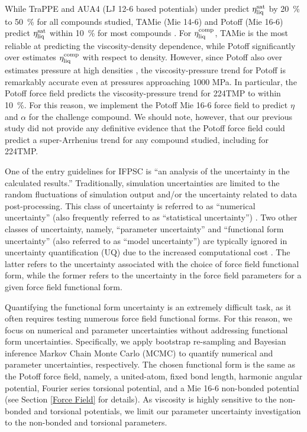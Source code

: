 \documentclass[preprint,review,12pt]{elsarticle}
\begin{document}
	While TraPPE and AUA4 (LJ 12-6 based potentials) under predict $\eta_{\rm liq}^{\rm sat}$ by 20~\% to 50~\% for all compounds studied, TAMie (Mie 14-6) and Potoff (Mie 16-6) predict $\eta_{\rm liq}^{\rm sat}$ within 10~\% for most compounds \cite{Postdoc_3}. For $\eta_{\rm liq}^{\rm comp}$, TAMie is the most reliable at predicting the viscosity-density dependence, while Potoff significantly over estimates $\eta_{\rm liq}^{\rm comp}$ with respect to density. However, since Potoff also over estimates pressure at high densities \cite{Postdoc_2}, the viscosity-pressure trend for Potoff is remarkably accurate even at pressures approaching 1000 MPa. In particular, the Potoff force field predicts the viscosity-pressure trend for 224TMP to within 10~\%. For this reason, we implement the Potoff Mie 16-6 force field to predict $\eta$ and $\alpha$ for the challenge compound. We should note, however, that our previous study did not provide any definitive evidence that the Potoff force field could predict a super-Arrhenius trend for any compound studied, including for 224TMP.
	 
	One of the entry guidelines for IFPSC is ``an analysis of the uncertainty in the calculated results.'' Traditionally, simulation uncertainties are limited to the random fluctuations of simulation output and/or the uncertainty related to data post-processing. This class of uncertainty is referred to as ``numerical uncertainty'' (also frequently referred to as ``statistical uncertainty'') \cite{Bay_Deriv,Bay_MD,Bay_UQ,Mess4}. Two other classes of uncertainty, namely, ``parameter uncertainty'' and ``functional form uncertainty'' (also referred to as ``model uncertainty'') are typically ignored in uncertainty quantification (UQ) due to the increased computational cost \cite{Bay_Deriv,Bay_MD,Bay_UQ,Mess4}. The latter refers to the uncertainty associated with the choice of force field functional form, while the former refers to the uncertainty in the force field parameters for a given force field functional form.
	
	
	Quantifying the functional form uncertainty is an extremely difficult task, as it often requires testing numerous force field functional forms. For this reason, we focus on numerical and parameter uncertainties without addressing functional form uncertainties. Specifically, we apply bootstrap re-sampling \cite{Efron1979} and Bayesian inference Markov Chain Monte Carlo (MCMC) \cite{Bay_Deriv,Postdoc_2} to quantify numerical and parameter uncertainties, respectively. The chosen functional form is the same as the Potoff force field, namely, a united-atom, fixed bond length, harmonic angular potential, Fourier series torsional potential, and a Mie 16-6 non-bonded potential (see Section \ref{Force Field} for details). As viscosity is highly sensitive to the non-bonded \cite{Gordon2006,Postdoc_3} and torsional \cite{Nieto2006,Braga2012} potentials, we limit our parameter uncertainty investigation to the non-bonded and torsional parameters. 
	
\end{document}
